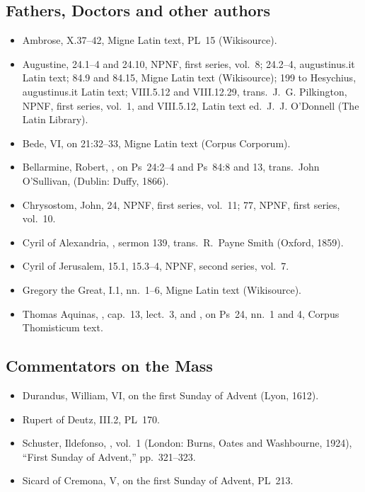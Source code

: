 {\subsection*{Fathers, Doctors and other authors}
\begin{itemize}[leftmargin=1.2em,itemsep=.25em]
\item Ambrose,  X.37--42, Migne
Latin text, PL~15 (Wikisource).
\item Augustine,  24.1--4 and 24.10, NPNF,
first series, vol.~8; 24.2--4, augustinus.it Latin text; 84.9 and 84.15,
Migne Latin text (Wikisource);  199 to Hesychius,
augustinus.it Latin text;  VIII.5.12 and VIII.12.29,
trans.\ J.~G. Pilkington, NPNF, first series, vol.~1, and VIII.5.12, Latin
text ed.\ J.~J. O'Donnell (The Latin Library).
\item Bede,  VI, on 21:32--33, Migne Latin
text (Corpus Corporum).
\item Bellarmine, Robert, , on Ps~24:2--4 and
Ps~84:8 and 13, trans.\ John O'Sullivan,  (Dublin: Duffy, 1866).
\item Chrysostom, John,  24, NPNF, first series,
vol.~11;  77, NPNF, first series, vol.~10.
\item Cyril of Alexandria, ,
sermon 139, trans.\ R.~Payne Smith (Oxford, 1859).
\item Cyril of Jerusalem,  15.1, 15.3--4, NPNF,
second series, vol.~7.
\item Gregory the Great,  I.1, nn.~1--6, Migne
Latin text (Wikisource).
\item Thomas Aquinas, , cap.~13, lect.~3,
and , on Ps~24, nn.~1 and 4, Corpus Thomisticum text.
\end{itemize}

\subsection*{Commentators on the Mass}
\begin{itemize}[leftmargin=1.2em,itemsep=.25em]
\item Durandus, William,  VI, on the
first Sunday of Advent (Lyon, 1612).
\item Rupert of Deutz,  III.2, PL~170.
\item Schuster, Ildefonso, ,
vol.~1 (London: Burns, Oates and Washbourne, 1924), ``First Sunday of
Advent,'' pp.~321--323.
\item Sicard of Cremona,  V, on the first Sunday of Advent,
PL~213.
\end{itemize}
\par}
